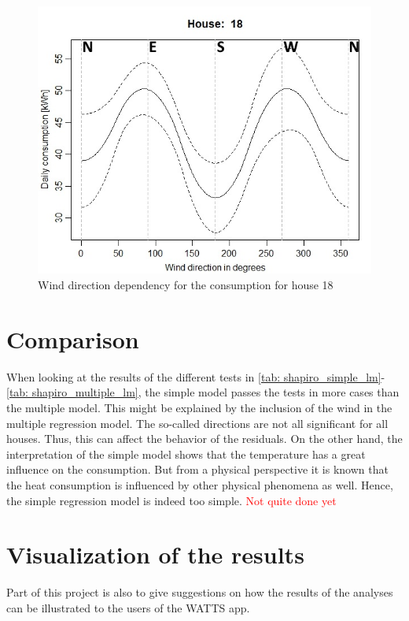 \begin{figure}
    \centering
    \includegraphics[width=.8\textwidth]{../../../figures/Wplot18.jpeg}
    \caption{Wind direction dependency for the consumption for house 18}
    \label{fig: Wplot18}
\end{figure}

\section{Comparison}
When looking at the results of the different tests in \cref{tab: shapiro_simple_lm}-\ref{tab: shapiro_multiple_lm}, the simple model passes the tests in more cases than the multiple model. This might be explained by the inclusion of the wind in the multiple regression model. The so-called directions are not all significant for all houses. Thus, this can affect the behavior of the residuals. On the other hand, the interpretation of the simple model shows that the temperature has a great influence on the consumption. But from a physical perspective it is known that the heat consumption is influenced by other physical phenomena as well. Hence, the simple regression model is indeed too simple. \textcolor{red}{Not quite done yet}

\section{Visualization of the results}
Part of this project is also to give suggestions on how the results of the analyses can be illustrated to the users of the WATTS app. 

